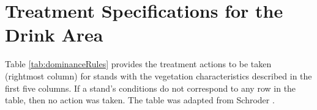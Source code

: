
\chapter{Treatment Specifications for the Drink Area}
\label{chap:appBTreatmentSpec}

Table \ref{tab:dominanceRules} provides the treatment actions to be taken (rightmost column) for stands with the vegetation characteristics described in the first five columns. If a stand's conditions do not correspond to any row in the table, then no action was taken. The table was adapted from Schroder \cite{schroder2016multi}.

